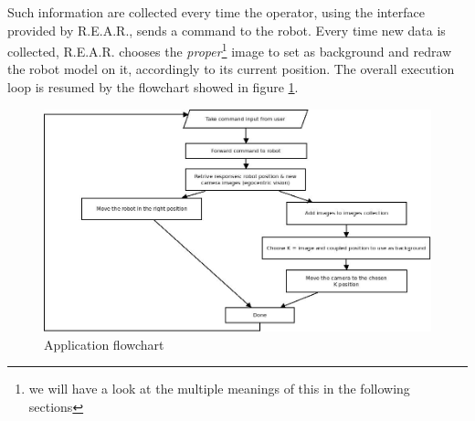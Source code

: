 %
Such information are collected every time the operator, using the 
interface provided by \textsf{R.E.A.R.}, sends a command to the robot.
%
Every time new data is collected, \textsf{R.E.A.R.} chooses the 
\textit{proper}\footnote{we will have a look at the multiple meanings 
of this in the following sections} image to set as background 
and redraw the robot model on it, accordingly to its current position.
%
The overall execution loop is resumed by the flowchart showed 
in figure \ref{fig:overall_diagram}.
%
\begin{figure}[!h]
  \begin{center}
    \includegraphics[width=350pt]{img/overall_diagram.jpeg}  %
    \caption{Application flowchart}
    \label{fig:overall_diagram}
  \end{center}
\end{figure}
%
%

%

